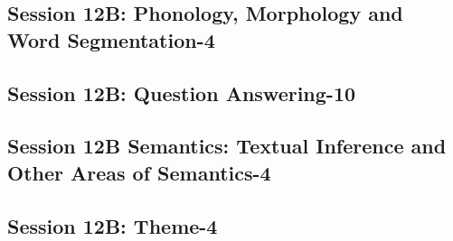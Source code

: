 \subsection{\large Session 12B: Phonology, Morphology and Word Segmentation-4}
\label{parallel-session-12B-trackF}
\TrackFLoc\hfill\sessionchair{}{}
\clearpage
\subsection{\large Session 12B: Question Answering-10}
\label{parallel-session-12B-trackG}
\TrackGLoc\hfill\sessionchair{}{}
\clearpage
\subsection{\large Session 12B Semantics: Textual Inference and Other Areas of Semantics-4}
\label{parallel-session-12B-trackH}
\TrackHLoc\hfill\sessionchair{}{}
\clearpage
\subsection{\large Session 12B: Theme-4}
\label{parallel-session-12B-trackI}
\TrackILoc\hfill\sessionchair{}{}
\clearpage


